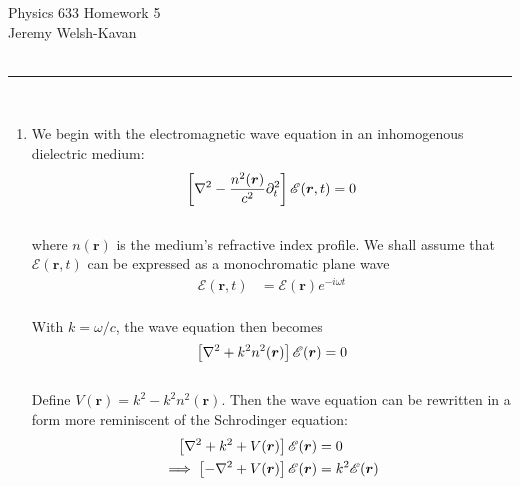 \documentclass[]{article}
\begin{document}
{\Large Physics 633 Homework 5}\\
{Jeremy Welsh-Kavan}\\
\hfill \\
\noindent\rule{15cm}{0.4pt} \\



\begin{enumerate}[1)]

\item We begin with the electromagnetic wave equation in an inhomogenous dielectric medium: \\

\begin{equation}
\begin{aligned}
\left[  \laplacian - \frac{ n^2(\bm{r} ) }{c^2} \partial_t^2    \right] \mathscr{E}( \bm{r},t) & = 0 \\ 
\end{aligned}
\end{equation} \\

where $n(\bm{r})$ is the medium's refractive index profile. We shall assume that $\mathscr{E}( \bm{r}, t)$ can be expressed as a monochromatic plane wave \\

\begin{equation}
\begin{aligned}
\mathscr{E} ( \bm{r}, t) & = \mathscr{E} ( \bm{r} ) e^{ - i \omega t}
\end{aligned}
\end{equation} \\

With $k = \omega/c$, the wave equation then becomes \\

\begin{equation}
\begin{aligned}
\left[  \laplacian +  k^2 n^2(\bm{r} )   \right] \mathscr{E}( \bm{r}) & = 0 \\ 
\end{aligned}
\end{equation} \\

Define $V(\bm{r})  = k^2 - k^2 n^2(\bm{r} ) $. Then the wave equation can be rewritten in a form more reminiscent of the Schrodinger equation: \\

\begin{equation}
\begin{aligned}
\left[  \laplacian + k^2 +   V(\bm{r})   \right] \mathscr{E}( \bm{r}) & = 0 \\ 
\implies \left[ - \laplacian +   V(\bm{r})   \right] \mathscr{E}( \bm{r}) & = k^2 \mathscr{E}( \bm{r}) \\ 
\end{aligned}
\end{equation} \\



\end{enumerate}
\end{document}
